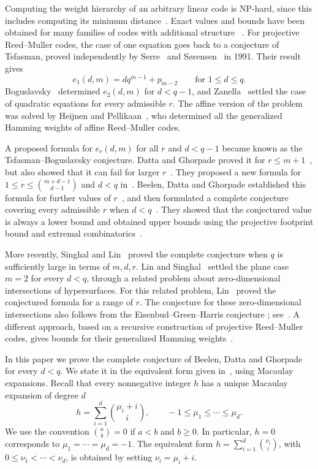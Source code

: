\documentclass[11pt]{amsart}
\theoremstyle{definition}
\numberwithin{equation}{section}
\begin{document}
Computing the weight hierarchy of an arbitrary linear code is
NP-hard, since this includes computing its minimum
distance~\cite{vardyIntractability}.
Exact values and bounds have been obtained for many families
of codes with additional structure ~\cite{munueraGHWhermitica,sanjoseGHWNT,sanjose_complete_intersections,sanjoseGHWMPC,beelenGHWcartesian,sanjose_squarefree}. For projective Reed--Muller codes, the case of one equation goes back to a conjecture of Tsfasman,
proved independently by Serre~\cite{Serre} and
S{\o}rensen~\cite{Sorensen} in 1991. Their result gives
\[
 e_1(d,m)=dq^{m-1}+p_{m-2}\qquad\text{for }1\le d\le q.
\]
Boguslavsky~\cite{Boguslavsky1997} determined $e_2(d,m)$ for
$d<q-1$, and Zanella~\cite{Zanella} settled the case of quadratic
equations for every admissible $r$. The affine version of the
problem was solved by Heijnen and Pellikaan~\cite{HP}, who
determined all the generalized Hamming weights of affine
Reed--Muller codes.

A proposed formula for $e_r(d,m)$ for all $r$ and $d<q-1$
became known as the Tsfasman--Boguslavsky conjecture.
Datta and Ghorpade proved it for $r\le m+1$~\cite{DG}, but
also showed that it can fail for larger $r$~\cite{DGRemarks2017}.
They proposed a new formula for
$1\le r\le\binom{m+d-1}{d-1}$ and $d<q$
in~\cite[Conj.~6.6]{DG}. Beelen, Datta and Ghorpade established
this formula for further values of $r$~\cite{BDG18}, and then
formulated a complete conjecture covering every admissible $r$
when $d<q$~\cite[Conj.~2.4]{BDG22}.
They showed that the conjectured value is always a lower bound
and obtained upper bounds using the projective footprint
bound and extremal combinatorics~\cite{BDG19footprint,BDG22}.

More recently, Singhal and Lin~\cite{SL} proved the complete
conjecture when $q$ is sufficiently large in terms of $m,d,r$.
Lin and Singhal~\cite[Thm.~1.5]{LinSinghal2025} settled the
plane case $m=2$ for every $d<q$, through a related problem
about zero-dimensional intersections of hypersurfaces. For this related problem,
Lin~\cite[Thm.~1.5]{LinArtinian2026} proved the conjectured
formula for a range of $r$. The conjecture for these zero-dimensional intersections
also follows from the Eisenbud--Green--Harris conjecture \cite{EisenbudGreenHarris1993,eisenbud_green_harris};
see~\cite[Sec.~2.2 and Prop.~3.1]{LinDimension2026}.
A different approach, based on a recursive construction of
projective Reed--Muller codes, gives bounds for their
generalized Hamming weights~\cite{SanJose}.

In this paper we prove the complete conjecture of Beelen,
Datta and Ghorpade for every $d<q$. We state it in the
equivalent form given in~\cite[Cor.~2.6]{BDG22}, using Macaulay
expansions. Recall that every nonnegative integer $h$ has a
unique Macaulay expansion of degree $d$
\begin{equation}\label{eq:macaulay}
 h=\sum_{i=1}^d\binom{\mu_i+i}{i},
 \qquad -1\le\mu_1\le\cdots\le\mu_d.
\end{equation}
We use the convention $\binom ab=0$ if $a<b$ and $b\ge0$.
In particular, $h=0$ corresponds to $\mu_1=\cdots=\mu_d=-1$.
The equivalent form $h=\sum_{i=1}^d\binom{\nu_i}{i}$, with
$0\le\nu_1<\cdots<\nu_d$, is obtained by setting
$\nu_i=\mu_i+i$.
\end{document}

